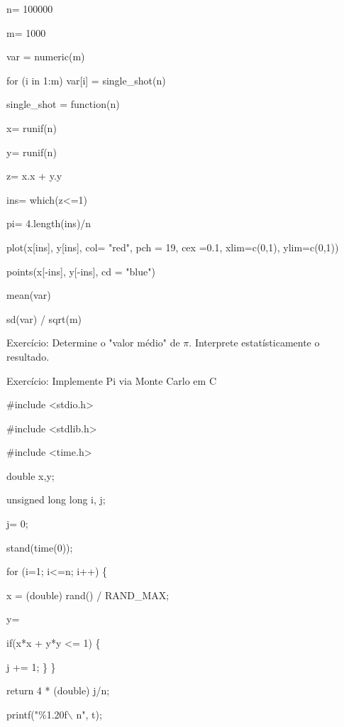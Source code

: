 \documentclass[a4paper, 12pt]{article}
\begin{document}
n= 100000
\newline

m= 1000

var = numeric(m)

for (i in 1:m) var[i] = single\_shot(n)

single\_shot = function(n)
\newline

x= runif(n)

y= runif(n)

z= x.x + y.y

ins= which(z<=1)

pi= 4.length(ins)/n
\newline

plot(x[ins], y[ins], col= "red", pch = 19, cex =0.1, xlim=c(0,1), ylim=c(0,1))

points(x[-ins], y[-ins], cd = "blue")
\newline

mean(var)

sd(var) / sqrt(m)
\newline

Exercício: Determine o "valor médio" de $\pi$. Interprete estatísticamente o resultado.
\newline

Exercício: Implemente Pi via Monte Carlo em C
\newline

\#include <stdio.h> 

\#include <stdlib.h> 

\#include <time.h>
\newline

double x,y;
\newline

unsigned long long i, j;
\newline

j= 0;
\newline

stand(time(0));
\newline

for (i=1; i<=n; i++) \{

x = (double) rand() / RAND\_MAX;

y=
\newline

if(x*x + y*y <= 1) \{

j += 1;
\}
\newline
\}
\newline

return 4 * (double) j/n;
\newline

printf("\%1.20f$\backslash$ n", t);
\end{document}
